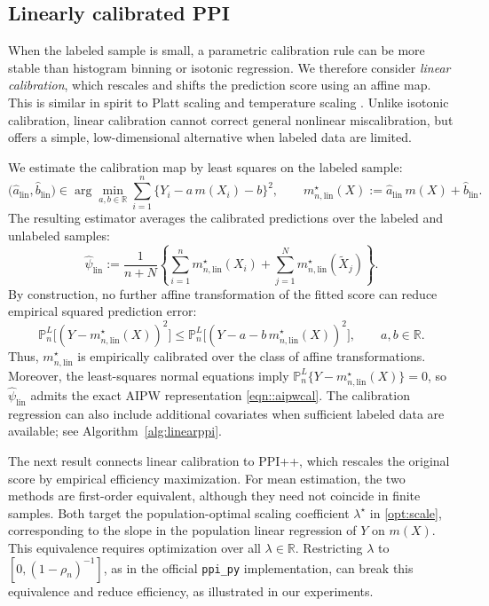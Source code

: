 \documentclass{article}
\theoremstyle{plain}
\theoremstyle{definition}
\newcommand{\R}{\mathbb{R}}
\newcommand{\1}{\mathbbm{1}}
\newcommand{\mhat}{m}
\newcommand{\Pl}{\mathbb{P}^{L}_n}
\begin{document}
\subsection{Linearly calibrated PPI}
\label{sec:linear}

When the labeled sample is small, a parametric calibration rule
can be more stable than histogram binning or isotonic regression.
We therefore consider \emph{linear calibration}, which rescales
and shifts the prediction score using an affine map. This is
similar in spirit to Platt scaling and temperature scaling
\citep{platt1999probabilistic,guo2017calibration}. Unlike
isotonic calibration, linear calibration cannot correct general
nonlinear miscalibration, but offers a simple, low-dimensional
alternative when labeled data are limited.

We estimate the calibration map by least squares on the
labeled sample:
\begin{equation}
\label{eq:linear-cal}
\bigl(\hat a_{\mathrm{lin}},\hat b_{\mathrm{lin}}\bigr)
\in\arg\min_{a,b\in\R}
\sum_{i=1}^n \{Y_i-a\,\mhat(X_i)-b\}^2,
\qquad
m_{n,\mathrm{lin}}^\star(X)
:=\hat a_{\mathrm{lin}}\,\mhat(X)+\hat b_{\mathrm{lin}}.
\end{equation}
The resulting estimator averages the calibrated predictions
over the labeled and unlabeled samples:
\begin{equation}
\label{eq:linear-plugin}
\widehat{\psi}_{\mathrm{lin}}
:= \frac{1}{n+N}
\left\{
\sum_{i=1}^n m_{n,\mathrm{lin}}^\star(X_i)
+
\sum_{j=1}^N m_{n,\mathrm{lin}}^\star(\widetilde X_j)
\right\}.
\end{equation}
By construction, no further affine transformation of the
fitted score can reduce empirical squared prediction error:
\[
\Pl\bigl[(Y-m_{n,\mathrm{lin}}^\star(X))^2\bigr]
\le
\Pl\bigl[(Y-a-b\,m_{n,\mathrm{lin}}^\star(X))^2\bigr],
\qquad a,b\in\R.
\]
Thus, $m_{n,\mathrm{lin}}^\star$ is empirically calibrated
over the class of affine transformations. Moreover, the
least-squares normal equations imply
$\Pl\{Y-m_{n,\mathrm{lin}}^\star(X)\}=0$, so
$\widehat{\psi}_{\mathrm{lin}}$ admits the exact AIPW
representation \eqref{eqn::aipwcal}. The calibration regression can also include additional
covariates when sufficient labeled data are available;
see Algorithm~\ref{alg:linearppi}.

The next result connects linear calibration to PPI++, which
rescales the original score by empirical efficiency maximization.
For mean estimation, the two methods are first-order equivalent,
although they need not coincide in finite samples. Both target
the population-optimal scaling coefficient $\lambda^\star$ in
\eqref{opt:scale}, corresponding to the slope in the population
linear regression of $Y$ on $m(X)$. This equivalence requires
optimization over all $\lambda\in\mathbb R$. Restricting
$\lambda$ to $[0,(1-\rho_n)^{-1}]$, as in the official
\texttt{ppi\_py} implementation, can break this equivalence
and reduce efficiency, as illustrated in our experiments.
\end{document}
